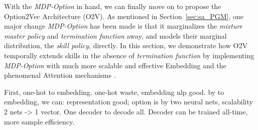 \documentclass{article}
\begin{document}
   


With the \emph{MDP-Option} in hand, we can finally move on to
propose the Option2Vec Architecture (O2V). As mentioned in
Section~\ref{sec:sa_PGM}, one major change \emph{MDP-Option} has
been made is that it marginalizes the \emph{mixture master
  policy} and \emph{termination function} away, and models their
marginal distribution, the \emph{skill policy}, directly. In this
section, we demonstrate how O2V temporally extends skills in the
absence of \emph{termination function} by implementing
\emph{MDP-Option} with much more scalable and effective Embedding
and the phenomenal Attention mechanisms
\cite{vaswani2017attention}.

First, one-hot to embedding. one-hot waste, embedding nlp good.
by to embedding, we can: representation good; option is by two
neural nets, scalability 2 nets -> 1 vector. One decoder to
decode all. Decoder can be trained all-time, more sample
efficiency.
\end{document}
